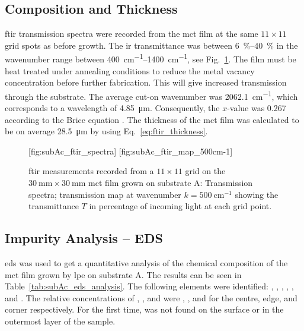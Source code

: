 \subsection{Composition and Thickness}

\Ac{ftir} transmission spectra were recorded from the \ac{mct} film at the same $11\times11$ grid spots as before growth. The \ac{ir} transmittance was between \SIrange{6}{40}{\percent} in the wavenumber range between \SIrange{400}{1400}{\centi\metre^{-1}}, see Fig.~\ref{fig:subAc_ftir}. The film must be heat treated under annealing conditions to reduce the metal vacancy concentration before further fabrication. This will give increased transmission through the substrate. The average cut-on wavenumber was \SI{2062.1}{\centi\metre^{-1}}, which corresponds to a wavelength of \SI{4.85}{\micro\metre}. Consequently, the $x$-value was \SI{0.267}{} according to the Brice equation \citep{brice1975some}. The thickness of the \ac{mct} film was calculated to be on average \SI{28.5}{\micro\metre} by using Eq.~\ref{eq:ftir_thickness}.

\begin{figure}[htbp]
    \centering
    [fig:subAc_ftir_spectra]
    \hfill
    [fig:subAc_ftir_map_500cm-1]
    \caption[\Ac{ftir} measurements of the \ac{mct} film grown on substrate A.]{\Ac{ftir} measurements recorded from a $11\times11$ grid on the $\SI{30}{\milli\metre}\times\SI{30}{\milli\metre}$ \ac{mct} film grown on substrate A:  Transmission spectra;  transmission map at wavenumber $k=\SI{500}{\centi\metre^{-1}}$ showing the transmittance $T$ in percentage of incoming light at each grid point.}\label{fig:subAc_ftir}
\end{figure}

\subsection{Impurity Analysis -- EDS}

\Ac{eds} was used to get a quantitative analysis of the chemical composition of the \ac{mct} film grown by \ac{lpe} on substrate A. The results can be seen in Table~\ref{tab:subAc_eds_analysis}. The following elements were identified: , , , , , and . The relative concentrations of , , and  were , , and  for the centre, edge, and corner respectively. For the first time,  was not found on the surface or in the outermost layer of the sample.

